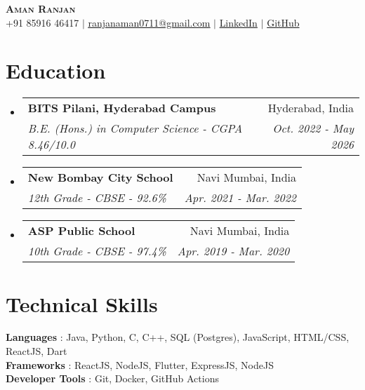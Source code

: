 \documentclass[letterpaper,11pt]{article}
\makeatletter
\newcommand{\resumeSubheading}[4]{
  \vspace{-2pt}\item
    \begin{tabular*}{0.97\textwidth}[t]{l@{\extracolsep{\fill}}r}
      \textbf{#1} & #2 \\
      \textit{\small#3} & \textit{\small #4} \\
    \end{tabular*}\vspace{-7pt}
}
\newcommand{\resumeSubHeadingListStart}{\begin{itemize}[leftmargin=0.15in, label={}]}
\newcommand{\resumeSubHeadingListEnd}{\end{itemize}}
\makeatother
\begin{document}

\begin{center}
    \textbf{\Huge \scshape Aman Ranjan} 
        \\ \vspace{1pt}
    \small +91 85916 46417 $|$ 
    \href{mailto:ranjanaman0711@gmail.com}
        {\underline{ranjanaman0711@gmail.com}} $|$ 
    \href{https://www.linkedin.com/in/aman-ranjan-b6662328a/}
        {LinkedIn} $|$
    \href{https://github.com/ikuchbhi}
        {GitHub}
\end{center}


\section{Education}
  \resumeSubHeadingListStart
    \resumeSubheading
      {BITS Pilani, Hyderabad Campus}{Hyderabad, India}
      {B.E. (Hons.) in Computer Science - CGPA 8.46/10.0}{Oct. 2022 - May 2026}
    \resumeSubheading
      {New Bombay City School}{Navi Mumbai, India}
      {12th Grade - CBSE - 92.6\%}{Apr. 2021 - Mar. 2022}
    \resumeSubheading
      {ASP Public School}{Navi Mumbai, India}
      {10th Grade - CBSE - 97.4\%}{Apr. 2019 - Mar. 2020}
  \resumeSubHeadingListEnd

\section{Technical Skills}
 \begin{itemize}[leftmargin=0.15in, label={}]
    \small{
        \item{
            \textbf
            {Languages}
            {: Java, Python, C, C++, SQL (Postgres), JavaScript, HTML/CSS, ReactJS, Dart} \\
            \textbf
            {Frameworks}
            {: ReactJS, NodeJS, Flutter, ExpressJS, NodeJS} \\
            \textbf
            {Developer Tools}
            {: Git, Docker, GitHub Actions}
        }
    }
 \end{itemize}
\end{document}
